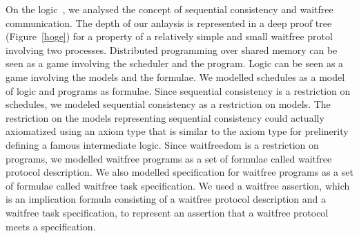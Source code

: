  On the logic~\iec, we analysed the concept of sequential consistency and waitfree
 communication.
 The depth of our anlaysis is represented in a deep proof tree (Figure~\ref{hoge}) for a
 property of a relatively simple and small waitfree protol involving two processes.
 Distributed programming over shared memory can be seen as a game involving the scheduler
 and the program.
 Logic can be seen as a game involving the models and the formulae.
 We modelled schedules as a model of logic and programs as formulae.
 Since sequential consistency is a restriction on schedules,
 we modeled sequential consistency as a restriction on models.
 The restriction on the models representing sequential consistency could actually
 axiomatized using an axiom type that is similar to the axiom type for prelinerity defining
 a famous intermediate logic.
 Since waitfreedom is a restriction on programs,
 we modelled waitfree programs as a set of formulae called waitfree protocol description.
 We also modelled specification for waitfree programs as a set of formulae called waitfree
 task specification.
 We used a waitfree assertion, which is
 an implication formula consisting of a waitfree protocol description and a
 waitfree task specification,
 to represent
 an assertion that a waitfree protocol meets a specification.
